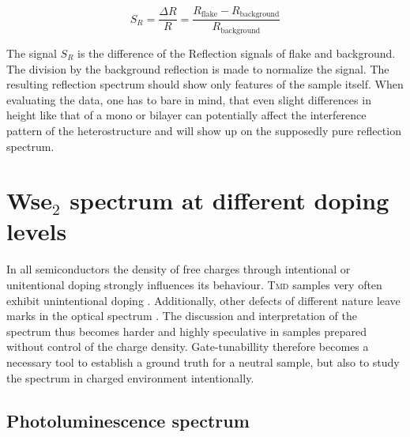 \[ 
	S_R = \frac{\Delta R}{R} = \frac{R_{\mathrm{flake}} - R_{\mathrm{background}}}{R_{\mathrm{background}}}
\]

The signal $S_R$ is the difference of the Reflection signals of \tmdg flake and background. The division by the background reflection is made to normalize the signal. The resulting reflection spectrum should show only features of the sample itself. When evaluating the data, one has to bare in mind, that even slight differences in height like that of a mono or bilayer can potentially affect the interference pattern of the heterostructure and will show up on the supposedly pure reflection spectrum. 

\section{Ws\textup{e}$_2$ spectrum at different doping levels}

In all semiconductors the density of free charges through intentional or unitentional doping strongly influences its behaviour. \textsc{Tmd} samples very often exhibit unintentional doping \cite{kang_origin_2017, eshun_doping_2015}. Additionally, other defects of different nature leave marks in the optical spectrum  \cite{chow_defect-induced_2015,lin_defect_2016}. The discussion and interpretation of the spectrum thus becomes harder and highly speculative in samples prepared without control of the charge density. Gate-tunabillity therefore becomes a necessary tool to establish a ground truth for a neutral sample, but also to study the spectrum in charged environment intentionally.

\subsection{Photoluminescence spectrum}

